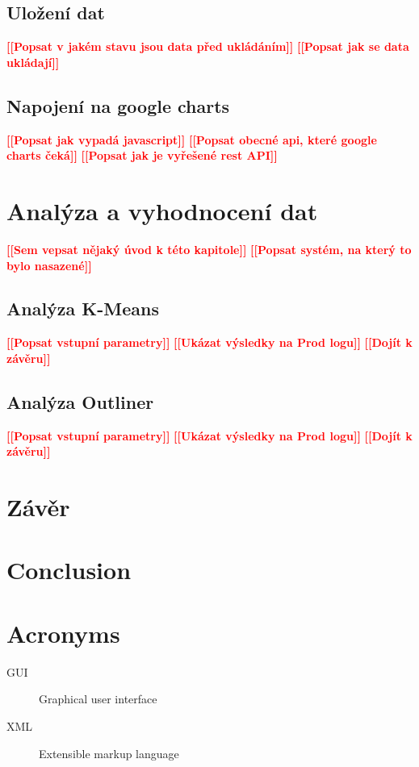 \documentclass[thesis=M,czech]{FITthesis}[2012/10/20]
\newcommand{\todo}[1]{\textcolor{red}{\textbf{[[#1]]}}}
\newcommand{\blind}[1][1]{\textcolor{gray}{\Blindtext[#1][1]}}
\begin{document}
	\section{Uložení dat}
		\todo{Popsat v jakém stavu jsou data před ukládáním}
		\todo{Popsat jak se data ukládají}					
		\blind[2]
		
	\section{Napojení na google charts}
		\todo{Popsat jak vypadá javascript}
		\blind[1]
		\todo{Popsat obecné api, které google charts čeká}
		\blind[1]
		\todo{Popsat jak je vyřešené rest API}				
		\blind[1]

\chapter{Analýza a vyhodnocení dat}
	\todo{Sem vepsat nějaký úvod k této kapitole}
	\blind[1]
	\todo{Popsat systém, na který to bylo nasazené}
	\blind[1]
	\section{Analýza K-Means}
		\todo{Popsat vstupní parametry}
		\todo{Ukázat výsledky na Prod logu}	
		\todo{Dojít k závěru}						
		\blind[2]
	\section{Analýza Outliner}
		\todo{Popsat vstupní parametry}
		\todo{Ukázat výsledky na Prod logu}	
		\todo{Dojít k závěru}						
		\blind[2]

\chapter{Závěr}

\chapter{Conclusion}





\appendix

\chapter{Acronyms}
\begin{description}
	\item[GUI] Graphical user interface
	\item[XML] Extensible markup language
\end{description}
\end{document}
